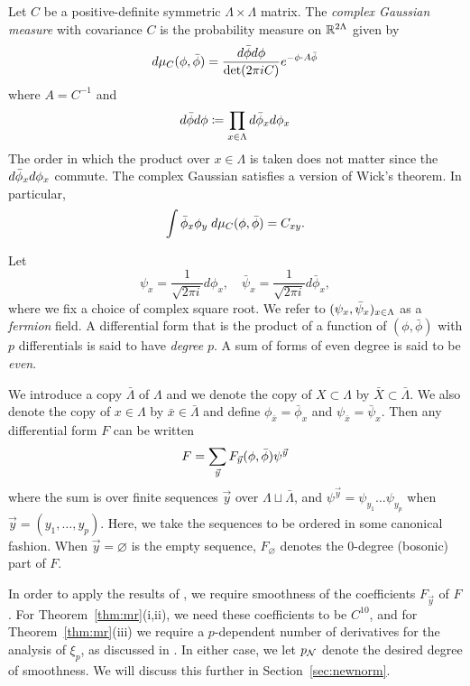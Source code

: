 \begin{example}
Let $C$ be a positive-definite symmetric $\Lambda\times\Lambda$ matrix. The
\emph{complex Gaussian measure} with covariance $C$ is the probability measure
on ${\mathbb R}^{2\Lambda}$ given by
\begin{equation}
d\mu_C(\phi, \bar\phi)
	=
\frac{d\bar\phi d\phi}{\det(2\pi i C)} e^{-\phi \cdot A \bar\phi}
\end{equation}
where $A = C^{-1}$ and
\begin{equation}
d\bar\phi d\phi \coloneqq \prod_{x\in\Lambda} d\bar\phi_x d\phi_x
\end{equation}
The order in which the product over $x\in\Lambda$ is taken does not matter
since the $d\bar\phi_x d\phi_x$ commute. The complex Gaussian satisfies a
version of Wick's theorem. In particular,
\begin{equation}
\label{e:wick-complex2}
\int \bar\phi_x \phi_y \; d\mu_C(\phi, \bar\phi) = C_{xy}.
\end{equation}
\end{example}

Let
\begin{equation}
\psi_x = \frac{1}{\sqrt{2\pi i}} d\phi_x,
\quad
\bar\psi_x = \frac{1}{\sqrt{2\pi i}} d\bar\phi_x,
\end{equation}
where we fix a choice of complex square root. We refer to $(\psi_x, \bar\psi_x)_{x\in\Lambda}$
as a \emph{fermion} field.
A differential form that is the
product of a function of $(\phi, \bar\phi)$
with $p$ differentials is said to have \emph{degree} $p$.
A sum of forms of even degree is said to be \emph{even}.

We introduce a copy $\bar\Lambda$ of $\Lambda$
and we denote the copy of $X \subset \Lambda$ by $\bar X \subset \bar\Lambda$.
We also denote the copy of $x \in \Lambda$
by $\bar x \in \bar\Lambda$ and define $\phi_{\bar x} = \bar\phi_x$ and $\psi_{\bar x} = \bar\psi_x$.
Then any differential form $F$ can be written
\begin{equation}
\lbeq{FinNcal}
F
=
\sum_{\vec y}
F_{\vec y} (\phi, \bar\phi)
\psi^{\vec y}
\end{equation}
where the sum is over finite sequences $\vec y$ over $\Lambda\sqcup\bar\Lambda$,
and $\psi^{\vec y} = \psi_{y_1} \ldots \psi_{y_p}$
when $\vec y = (y_1, \ldots, y_p)$. Here, we take the sequences to be ordered in
some canonical fashion. When $\vec y = \varnothing$ is the empty sequence,
$F_\varnothing$ denotes the $0$-degree (bosonic) part of $F$.

In order to apply the results of \cite{BBS-saw4-log,BBS-saw4,BSTW-clp}, we require
smoothness of the coefficients $F_{\vec y}$ of $F$.  For Theorem~\ref{thm:mr}(i,ii),
we need these coefficients to be $C^{10}$, and for Theorem~\ref{thm:mr}(iii) we require
a $p$-dependent number of derivatives for the analysis of $\xi_p$, as discussed in \cite{BSTW-clp}.
In either case, we let $p_{\mathcal{N}}$ denote the desired degree of smoothness.
We will discuss this further in Section~\ref{sec:newnorm}.

